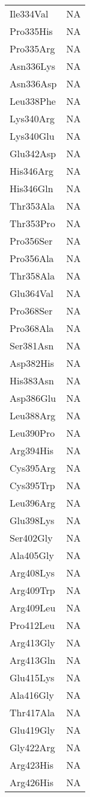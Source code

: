 \begin{tiny}
\begin{longtable}[l]{l|l}
	Ile334Val & NA \\
	Pro335His & NA \\
	Pro335Arg & NA \\
	Asn336Lys & NA \\
	Asn336Asp & NA \\
	Leu338Phe & NA \\
	Lys340Arg & NA \\
	Lys340Glu & NA \\
	Glu342Asp & NA \\
	His346Arg & NA \\
	His346Gln & NA \\
	Thr353Ala & NA \\
	Thr353Pro & NA \\
	Pro356Ser & NA \\
	Pro356Ala & NA \\
	Thr358Ala & NA \\
	Glu364Val & NA \\
	Pro368Ser & NA \\
	Pro368Ala & NA \\
	Ser381Asn & NA \\
	Asp382His & NA \\
	His383Asn & NA \\
	Asp386Glu & NA \\
	Leu388Arg & NA \\
	Leu390Pro & NA \\
	Arg394His & NA \\
	Cys395Arg & NA \\
	Cys395Trp & NA \\
	Leu396Arg & NA \\
	Glu398Lys & NA \\
	Ser402Gly & NA \\
	Ala405Gly & NA \\
	Arg408Lys & NA \\
	Arg409Trp & NA \\
	Arg409Leu & NA \\
	Pro412Leu & NA \\
	Arg413Gly & NA \\
	Arg413Gln & NA \\
	Glu415Lys & NA \\
	Ala416Gly & NA \\
	Thr417Ala & NA \\
	Glu419Gly & NA \\
	Gly422Arg & NA \\
	Arg423His & NA \\
	Arg426His & NA \\

\end{longtable}
\end{tiny}
